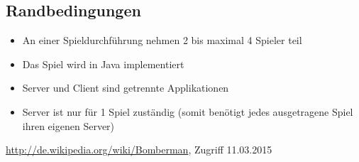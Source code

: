 \documentclass[11pt]{scrartcl}
\begin{document}
\subsection{Randbedingungen}
\label{sec:Randbedingungen}
\begin{itemize}
    \item An einer Spieldurchführung nehmen 2 bis maximal 4 Spieler teil
    \item Das Spiel wird in Java implementiert
    \item Server und Client sind getrennte Applikationen
    \item Server ist nur für 1 Spiel zuständig (somit benötigt jedes ausgetragene Spiel ihren eigenen Server)
\end{itemize}


\begin{thebibliography}{999}
\url{http://de.wikipedia.org/wiki/Bomberman}, Zugriff 
11.03.2015
\end{thebibliography}
\end{document}
